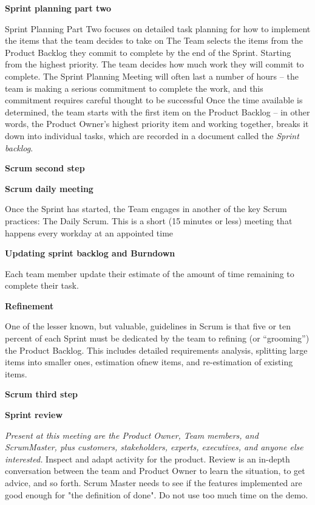 \documentclass{article}
\begin{document}
\begin{flushleft}
    \textbf{Sprint planning part two}\par
    Sprint Planning Part Two focuses on detailed task planning for how to implement the items that the team decides to take on
    The Team selects the items from the Product Backlog they commit to complete by the end of the Sprint. Starting from the highest priority.
    The team decides how much work they will commit to complete.
    The Sprint Planning Meeting will often last a number of hours – the team is making a serious commitment to complete the work, and this commitment requires careful thought to be successful
    Once the time available is determined, the team starts with the first item on the Product Backlog – in other words, the Product Owner’s highest priority item and working together, breaks it down into individual tasks, which are recorded in a document called the \emph{Sprint backlog}.

    \bigskip

    \textbf{\large Scrum second step}\par
    \textbf{Scrum daily meeting}\par
    Once the Sprint has started, the Team engages in another of the key Scrum practices: The Daily Scrum. This is a short (15 minutes or less) meeting that happens every workday at an appointed time\par
    \bigskip
    \textbf{Updating sprint backlog and Burndown}\par
    Each team member update their estimate of the amount of time remaining to complete their task. 

    \bigskip
    \textbf{Refinement}\par
    One of the lesser known, but valuable, guidelines in Scrum is that five or ten percent of each Sprint must be dedicated by the team to refining (or “grooming”) the Product Backlog. This includes detailed requirements analysis, splitting large items into smaller ones, estimation ofnew items, and re-estimation of existing items. 


    \bigskip

    \textbf{\large Scrum third step}\par
    \textbf{Sprint review}\par
    \emph{Present at this meeting are the Product Owner, Team members, and ScrumMaster, plus
    customers, stakeholders, experts, executives, and anyone else interested. }
    Inspect and adapt activity for the product. Review is an in-depth conversation between the team and Product Owner to learn the situation, to get advice, and so forth. 
    Scrum Master needs to see if the features implemented are good enough for "the definition of done". 
    Do not use too much time on the demo.


\end{flushleft}
\end{document}
